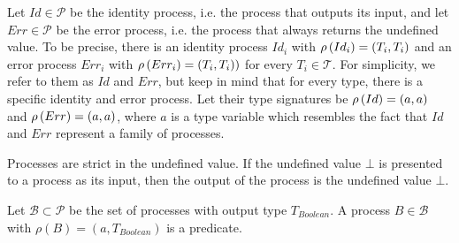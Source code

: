 
\begin{definition}
Let $Id \in \mathcal{P}$ be the identity process, i.e. the process that outputs its input, and let $Err \in \mathcal{P}$ be the error process, i.e. the process that always returns the undefined value. To be precise, there is an identity process $Id_i$ with $\rho \left( Id_i \right) = \left( T_i, T_i \right)$ and an error process $Err_i$ with $\rho \left( Err_i \right) = \left( T_i, T_i \right))$ for every $T_i \in \mathcal{T}$. For simplicity, we refer to them as $Id$ and $Err$, but keep in mind that for every type, there is a specific identity and error process. Let their type signatures be $\rho \left( Id \right) = \left( a, a \right)$ and $\rho \left( Err \right) = \left( a, a \right)$, where $a$ is a type variable which resembles the fact that $Id$ and $Err$ represent a family of processes.

\hfill\qedsymbol
\end{definition}


\begin{definition}
\label{def:process_strictness}
Processes are strict in the undefined value. If the undefined value $\bot$ is presented to a process as its input, then the output of the process is the undefined value $\bot$. %

\hfill\qedsymbol
\end{definition}

\begin{definition}
Let $\mathcal{B} \subset \mathcal{P}$ be the set of processes with output type $T_{Boolean}$. A process $B \in \mathcal{B}$ with $\rho \left( B \right) = \left( a, T_{Boolean} \right)$ is a predicate.

\hfill\qedsymbol
\end{definition}


